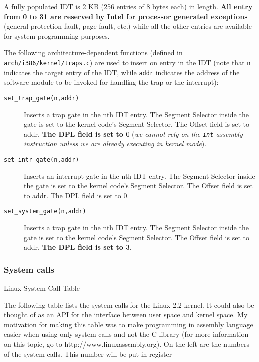 \documentclass[10pt,a4paper]{article}
\begin{document}
A fully populated IDT is 2 KB (256 entries of 8 bytes each) in length. \textbf{All entry from 0 to 31 are reserved by Intel for processor generated exceptions} (general protection fault, page fault, etc.) while all the other entries are available for system programming purposes.

The following architecture-dependent functions (defined in \texttt{arch/i386/kernel/traps.c}) are used to insert on entry in the IDT (note that \texttt{n} indicates the target entry of the IDT, while \texttt{addr} indicates the address of the software module to be invoked for handling the trap or the interrupt):
\begin{description} 
\item[\texttt{set\_trap\_gate(n,addr)}] Inserts a trap gate in the nth IDT entry. The Segment Selector inside the gate is set to the kernel code’s Segment Selector. The Offset field is set to addr. \textbf{The DPL field is set to 0} (\textit{we cannot rely on the \texttt{int} assembly instruction unless we are already executing in kernel mode}).
\item[\texttt{set\_intr\_gate(n,addr)}] Inserts an interrupt gate in the nth IDT entry. The Segment Selector inside the gate is set to the kernel code's Segment Selector. The Offset field is set to addr. The DPL field is set to 0.
\item[\texttt{set\_system\_gate(n,addr)}] Inserts a trap gate in the nth IDT entry. The Segment Selector inside the gate is set to the kernel code's Segment Selector. The Offset field is set to addr. \textbf{The DPL field is set to 3}.
\end{description}









\subsubsection{System calls}

Linux System Call Table

The following table lists the system calls for the Linux 2.2 kernel. It could also be thought of as an API for the interface between user space and kernel space. My motivation for making this table was to make programming in assembly language easier when using only system calls and not the C library (for more information on this topic, go to http://www.linuxassembly.org). On the left are the numbers of the system calls. This number will be put in register %
\end{document}
